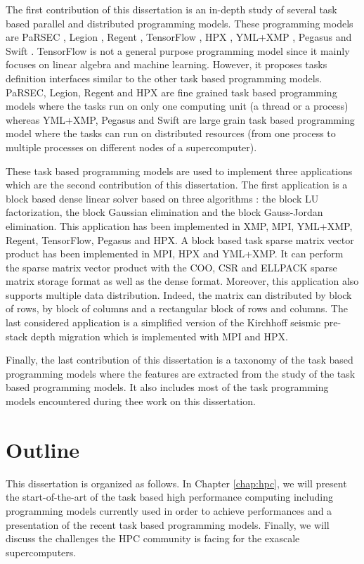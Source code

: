 The first contribution of this dissertation is an in-depth study of several task based parallel and distributed programming models.
These programming models are PaRSEC \cite{BBDHL2011}, Legion \cite{BaTSA2012}, Regent \cite{SLTBA2015}, TensorFlow \cite{AABBC2016}, HPX \cite{KHASF2014}, YML+XMP \cite{DelaP2004}, Pegasus \cite{DSSBG2005} and Swift \cite{ZHCFL2007}.
TensorFlow is not a general purpose programming model since it mainly focuses on linear algebra and machine learning.
However, it proposes tasks definition interfaces similar to the other task based programming models.
PaRSEC, Legion, Regent and HPX are fine grained task based programming models where the tasks run on only one computing unit (a thread or a process) whereas YML+XMP, Pegasus and Swift are large grain task based programming model where the tasks can run on distributed resources (from one process to multiple processes on different nodes of a supercomputer).

These task based programming models are used to implement three applications which are the second contribution of this dissertation.
The first application is a block based dense linear solver based on three algorithms : the block LU factorization, the block Gaussian elimination and the block Gauss-Jordan elimination.
This application has been implemented in XMP, MPI, YML+XMP, Regent, TensorFlow, Pegasus and HPX.
A block based task sparse matrix vector product has been implemented in MPI, HPX and YML+XMP.
It can perform the sparse matrix vector product with the COO, CSR and ELLPACK sparse matrix storage format as well as the dense format.
Moreover, this application also supports multiple data distribution.
Indeed, the matrix can distributed by block of rows, by block of columns and a rectangular block of rows and columns.
The last considered application is a simplified version of the Kirchhoff seismic pre-stack depth migration which is implemented with MPI and HPX.

Finally, the last contribution of this dissertation is a taxonomy of the task based programming models where the features are extracted from the study of the task based programming models.
It also includes most of the task programming models encountered during thee work on this dissertation.


\section{Outline}
This dissertation is organized as follows. In Chapter \ref{chap:hpc}, we will present the start-of-the-art of the task based high performance computing including programming models currently used in order to achieve performances and a presentation of the recent task based programming models.
Finally, we will discuss the challenges the HPC community is facing for the exascale supercomputers.


